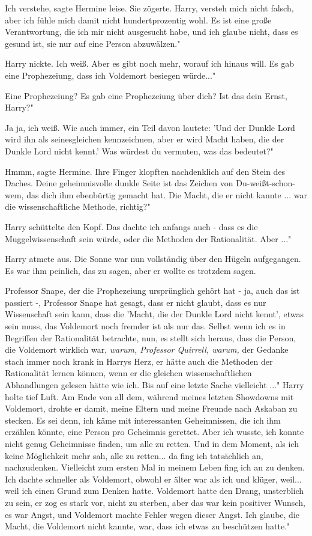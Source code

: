 \glqq Ich verstehe\grqq{}, sagte Hermine leise. Sie zögerte. \glqq Harry,
versteh mich nicht falsch, aber ich fühle mich damit nicht hundertprozentig
wohl. Es ist eine große Verantwortung, die ich mir nicht ausgesucht habe, und
ich glaube nicht, dass es gesund ist, sie nur auf eine Person abzuwälzen."

Harry nickte. \glqq Ich weiß. Aber es gibt noch mehr, worauf ich hinaus will. Es
gab eine Prophezeiung, dass ich Voldemort besiegen würde..."

\glqq Eine Prophezeiung? Es gab eine Prophezeiung über dich? Ist das dein Ernst,
Harry?"

\glqq Ja ja, ich weiß. Wie auch immer, ein Teil davon lautete: 'Und der Dunkle
Lord wird ihn als seinesgleichen kennzeichnen, aber er wird Macht haben, die der
Dunkle Lord nicht kennt.' Was würdest du vermuten, was das bedeutet?"

\glqq Hmmm\grqq{}, sagte Hermine. Ihre Finger klopften nachdenklich auf den
Stein des Daches. \glqq Deine geheimnisvolle dunkle Seite ist das Zeichen von
Du-weißt-schon-wem, das dich ihm ebenbürtig gemacht hat. Die Macht, die er nicht
kannte ... war die wissenschaftliche Methode, richtig?"

Harry schüttelte den Kopf. \glqq Das dachte ich anfangs auch - dass es die
Muggelwissenschaft sein würde, oder die Methoden der Rationalität. Aber ..."

Harry atmete aus. Die Sonne war nun vollständig über den Hügeln aufgegangen. Es
war ihm peinlich, das zu sagen, aber er wollte es trotzdem sagen.

\glqq Professor Snape, der die Prophezeiung ursprünglich gehört hat - ja, auch
das ist passiert -, Professor Snape hat gesagt, dass er nicht glaubt, dass es
nur Wissenschaft sein kann, dass die 'Macht, die der Dunkle Lord nicht kennt',
etwas sein muss, das Voldemort noch fremder ist als nur das. Selbst wenn ich es
in Begriffen der Rationalität betrachte, nun, es stellt sich heraus, dass die
Person, die Voldemort wirklich war\grqq{}, \emph{warum, Professor Quirrell,
warum, }der Gedanke stach immer noch krank in Harrys Herz, \glqq er hätte auch
die Methoden der Rationalität lernen können, wenn er die gleichen
wissenschaftlichen Abhandlungen gelesen hätte wie ich. Bis auf eine letzte Sache
vielleicht ..." Harry holte tief Luft. \glqq Am Ende von all dem, während meines
letzten Showdowns mit Voldemort, drohte er damit, meine Eltern und meine Freunde
nach Askaban zu stecken. Es sei denn, ich käme mit interessanten Geheimnissen,
die ich ihm erzählen könnte, eine Person pro Geheimnis gerettet. Aber ich
wusste, ich konnte nicht genug Geheimnisse finden, um alle zu retten. Und in dem
Moment, als ich keine Möglichkeit mehr sah, alle zu retten... da fing ich
tatsächlich an, nachzudenken. Vielleicht zum ersten Mal in meinem Leben fing ich
an zu denken. Ich dachte schneller als Voldemort, obwohl er älter war als ich
und klüger, weil... weil ich einen Grund zum Denken hatte. Voldemort hatte den
Drang, unsterblich zu sein, er zog es stark vor, nicht zu sterben, aber das war
kein positiver Wunsch, es war Angst, und Voldemort machte Fehler wegen dieser
Angst. Ich glaube, die Macht, die Voldemort nicht kannte, war, dass ich etwas zu
beschützen hatte."

